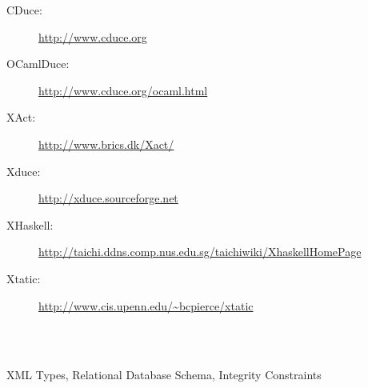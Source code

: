 \documentclass[twoside,leqno,onecolumn,pdftex]{article}
\begin{document}
\begin{URL}
\begin{description}
\item[CDuce: ] \url{http://www.cduce.org}
\item[OCamlDuce: ] \url{http://www.cduce.org/ocaml.html}
\item[XAct: ] \url{http://www.brics.dk/Xact/}
\item[Xduce: ] \url{http://xduce.sourceforge.net}
\item[XHaskell: ] \url{http://taichi.ddns.comp.nus.edu.sg/taichiwiki/XhaskellHomePage}
\item[Xtatic: ] \url{http://www.cis.upenn.edu/~bcpierce/xtatic}
\end{description}
\end{URL}
~\\\\
\begin{crossreference}
        XML Types,
        Relational Database Schema,
        Integrity Constraints
\end{crossreference}
~\\

\def\thebibliography#1{%
\parindent 0em
\vspace{6pt}
\begin{flushleft}\normalsize{\bf RECOMMENDED READING} \\
\suggestion
\end{flushleft}
\addvspace{3pt}\nopagebreak\list 
{[\arabic{enumi}]}{\settowidth\labelwidth{mm} 
\leftmargin\labelwidth 
 \advance\leftmargin\labelsep 
 \usecounter{enumi}\@bibsetup} 
\def\newblock{\hskip .11em plus .33em minus -.07em} 
 \sloppy\clubpenalty4000\widowpenalty4000 
 \sfcode`\.=1000\relax} 
 
\def\@bibsetup{\itemindent=0pt \itemsep=0pt \parsep=0pt
\small} 
\end{document}
